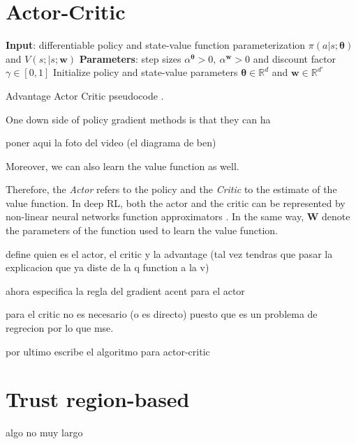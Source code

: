 \documentclass[twoside,twocolumn]{article}
\begin{document}
\section{Actor-Critic}

\begin{algorithm}[h]
 \textbf{Input}: differentiable policy and state-value function parameterization $\pi(a|s;\boldsymbol{\theta})$ and $V(s;|s;\boldsymbol{w})$\;
 \textbf{Parameters}: step sizes $\alpha^{\boldsymbol{\theta}}>0,\  \alpha^{\boldsymbol{w}}>0$ and discount factor $\gamma \in [0,1]$\;
 Initialize policy and state-value parameters $\boldsymbol{\theta}\in\mathbb{R}^d$ and $\boldsymbol{w}\in\mathbb{R}^{d'}$\;
 \caption{Advantage Actor Critic pseudocode \cite{Sutton1998}.}
\end{algorithm}


One down side of policy gradient methods is that they can ha

poner aqui la foto del video (el diagrama de ben)

Moreover, we can also learn the value function as well.

Therefore, the \emph{Actor} refers to the policy and the \emph{Critic} to the estimate of the value function. In deep RL, both the actor and the critic can be represented by non-linear neural networks function approximators \cite{mnih2016asynchronous}.
 In the same way, $\boldsymbol{W}$ denote the parameters of the function used to learn the value function.

define quien es el actor, el critic y la advantage (tal vez tendras que pasar la explicacion que ya diste de la q function a la v)

ahora especifica la regla del gradient acent para el actor

para el critic no es necesario (o es directo) puesto que es un problema de regrecion por lo que mse.

por ultimo escribe el algoritmo para actor-critic

\section{Trust region-based}

algo no muy largo


\printbibliography

\end{document}
